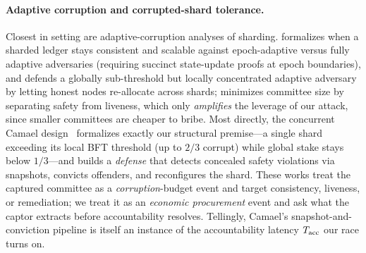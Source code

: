 \paragraph{Adaptive corruption and corrupted-shard tolerance.}
Closest in setting are adaptive-corruption analyses of sharding. \cite{avarikioti2019divide}
formalizes when a sharded ledger stays consistent and scalable against epoch-adaptive versus fully
adaptive adversaries (requiring succinct state-update proofs at epoch boundaries), and
\cite{rana2022free2shard} defends a globally sub-threshold but locally concentrated adaptive adversary
by letting honest nodes re-allocate across shards; \cite{david2022gearbox} minimizes committee size by
separating safety from liveness, which only \emph{amplifies} the leverage of our attack, since smaller
committees are cheaper to bribe. Most directly, the concurrent Camael design~\cite{liu2025camael}
formalizes exactly our structural premise---a single shard exceeding its local BFT threshold (up to
$2/3$ corrupt) while global stake stays below $1/3$---and builds a \emph{defense} that detects
concealed safety violations via snapshots, convicts offenders, and reconfigures the shard. These works
treat the captured committee as a \emph{corruption}-budget event and target consistency, liveness, or
remediation; we treat it as an \emph{economic procurement} event and ask what the captor extracts
before accountability resolves. Tellingly, Camael's snapshot-and-conviction pipeline is itself an
instance of the accountability latency $T_{\mathrm{acc}}$ our race turns on.


